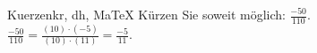\begin{MAufgabe}{Kuerzen}{kr, dh, MaTeX}
K\"urzen Sie soweit m\"oglich: $\frac{-50}{110}$.\\ 
\ifLsg\MLoesung
\quad $\frac{-50}{110}=\frac{(10)\cdot(-5)}{(10)\cdot(11)}=\frac{-5}{11}$.\else\relax\fi
 \end{MAufgabe}